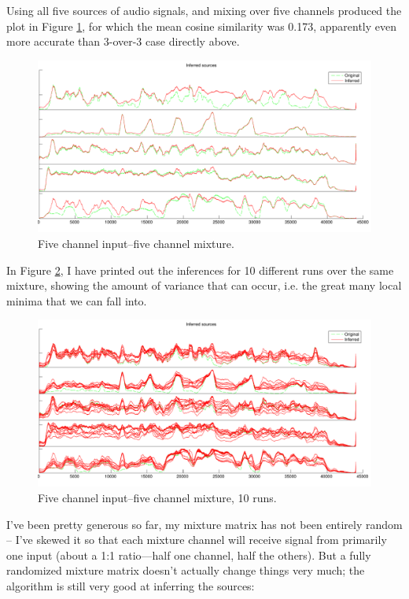 \documentclass[11pt]{report}
\begin{document}
Using all five sources of audio signals, and mixing over five channels produced the plot in Figure \ref{fig:c}, for which the mean cosine similarity was 0.173, apparently even more accurate than 3-over-3 case directly above.
\begin{figure}[H]
  \centering
  \includegraphics[width=\textwidth]{../plots/goodmatch5.pdf}
  \caption{Five channel input--five channel mixture.}
  \label{fig:c}
\end{figure}
In Figure \ref{fig:d}, I have printed out the inferences for 10 different runs over the same mixture, showing the amount of variance that can occur, i.e. the great many local minima that we can fall into.
\begin{figure}[H]
  \centering
  \includegraphics[width=\textwidth]{../plots/5channels10.pdf}
  \caption{Five channel input--five channel mixture, 10 runs.}
  \label{fig:d}
\end{figure}
I've been pretty generous so far, my mixture matrix has not been entirely random -- I've skewed it so that each mixture channel will receive signal from primarily one input (about a 1:1 ratio---half one channel, half the others). But a fully randomized mixture matrix doesn't actually change things very much; the algorithm is still very good at inferring the sources:
\end{document}

